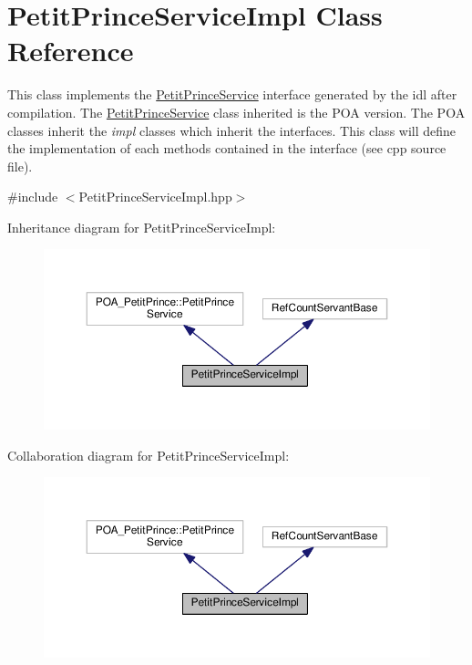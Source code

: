 \hypertarget{class_petit_prince_service_impl}{}\section{Petit\+Prince\+Service\+Impl Class Reference}
\label{class_petit_prince_service_impl}


This class implements the \hyperlink{class_petit_prince_service}{Petit\+Prince\+Service} interface generated by the idl after compilation. The \hyperlink{class_petit_prince_service}{Petit\+Prince\+Service} class inherited is the P\+OA version. The P\+OA classes inherit the {\itshape impl} classes which inherit the interfaces. This class will define the implementation of each methods contained in the interface (see cpp source file).  




{\ttfamily \#include $<$Petit\+Prince\+Service\+Impl.\+hpp$>$}



Inheritance diagram for Petit\+Prince\+Service\+Impl\+:
\nopagebreak
\begin{figure}[H]
\begin{center}
\leavevmode
\includegraphics[width=350pt]{class_petit_prince_service_impl__inherit__graph}
\end{center}
\end{figure}


Collaboration diagram for Petit\+Prince\+Service\+Impl\+:
\nopagebreak
\begin{figure}[H]
\begin{center}
\leavevmode
\includegraphics[width=350pt]{class_petit_prince_service_impl__coll__graph}
\end{center}
\end{figure}
